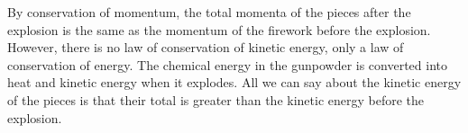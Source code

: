 By conservation of momentum, the total momenta of the pieces
after the explosion is the same as the momentum of the firework
before the explosion. However, there is no law of conservation
of kinetic energy, only a law of conservation of energy. The chemical
energy in the gunpowder is converted into heat and kinetic energy when
it explodes. All we can say about the kinetic energy of the pieces is
that their total is greater than the kinetic energy before the
explosion.



